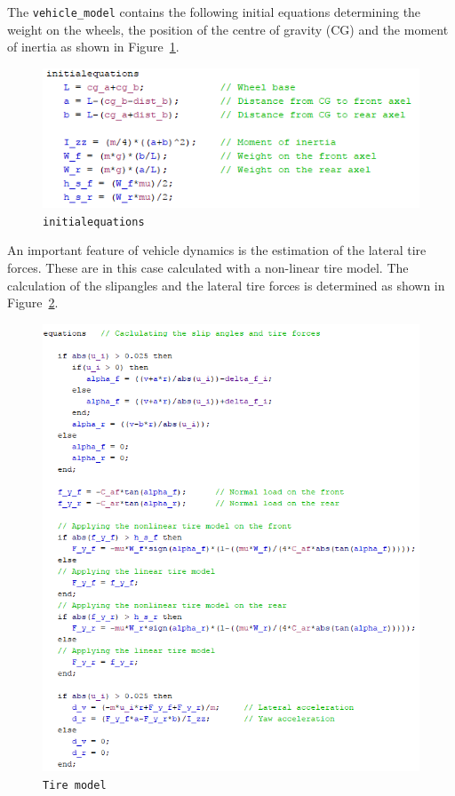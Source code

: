 \begin{description}
	The \texttt{vehicle\_model} contains the following initial equations determining the weight on the wheels, the position of the centre of gravity (CG) and the moment of inertia as shown in Figure~\ref{fig:initial_equations}. 
	\begin{figure}[htbp]
	\begin{center}
		\includegraphics[scale=1]{vehicle/initial_equations.png}
			\caption{\texttt{initialequations}}
			\label{fig:initial_equations}
	\end{center}
	\end{figure}
	An important feature of vehicle dynamics is the estimation of the lateral tire forces. These are in this case calculated with a non-linear tire model. The calculation of the slipangles and the lateral tire forces is determined as shown in Figure~\ref{fig:tire_model}.
		\begin{figure}[htbp]
		\begin{center}
			\includegraphics[width = 1\linewidth]{vehicle/tire_model.png}
			\caption{\texttt{Tire model}}
			\label{fig:tire_model}
		\end{center}
	\end{figure}



\end{description}
